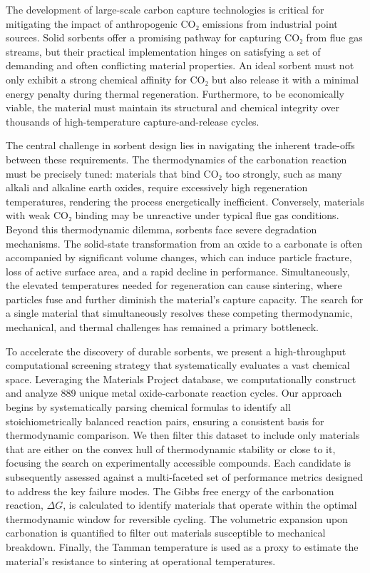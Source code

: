 \documentclass[]{article}
\begin{document}
The development of large-scale carbon capture technologies is critical for mitigating the impact of anthropogenic CO₂ emissions from industrial point sources. Solid sorbents offer a promising pathway for capturing CO₂ from flue gas streams, but their practical implementation hinges on satisfying a set of demanding and often conflicting material properties. An ideal sorbent must not only exhibit a strong chemical affinity for CO₂ but also release it with a minimal energy penalty during thermal regeneration. Furthermore, to be economically viable, the material must maintain its structural and chemical integrity over thousands of high-temperature capture-and-release cycles.

The central challenge in sorbent design lies in navigating the inherent trade-offs between these requirements. The thermodynamics of the carbonation reaction must be precisely tuned: materials that bind CO₂ too strongly, such as many alkali and alkaline earth oxides, require excessively high regeneration temperatures, rendering the process energetically inefficient. Conversely, materials with weak CO₂ binding may be unreactive under typical flue gas conditions. Beyond this thermodynamic dilemma, sorbents face severe degradation mechanisms. The solid-state transformation from an oxide to a carbonate is often accompanied by significant volume changes, which can induce particle fracture, loss of active surface area, and a rapid decline in performance. Simultaneously, the elevated temperatures needed for regeneration can cause sintering, where particles fuse and further diminish the material's capture capacity. The search for a single material that simultaneously resolves these competing thermodynamic, mechanical, and thermal challenges has remained a primary bottleneck.

To accelerate the discovery of durable sorbents, we present a high-throughput computational screening strategy that systematically evaluates a vast chemical space. Leveraging the Materials Project database, we computationally construct and analyze 889 unique metal oxide-carbonate reaction cycles. Our approach begins by systematically parsing chemical formulas to identify all stoichiometrically balanced reaction pairs, ensuring a consistent basis for thermodynamic comparison. We then filter this dataset to include only materials that are either on the convex hull of thermodynamic stability or close to it, focusing the search on experimentally accessible compounds. Each candidate is subsequently assessed against a multi-faceted set of performance metrics designed to address the key failure modes. The Gibbs free energy of the carbonation reaction, $\Delta G$, is calculated to identify materials that operate within the optimal thermodynamic window for reversible cycling. The volumetric expansion upon carbonation is quantified to filter out materials susceptible to mechanical breakdown. Finally, the Tamman temperature is used as a proxy to estimate the material's resistance to sintering at operational temperatures.
\end{document}
